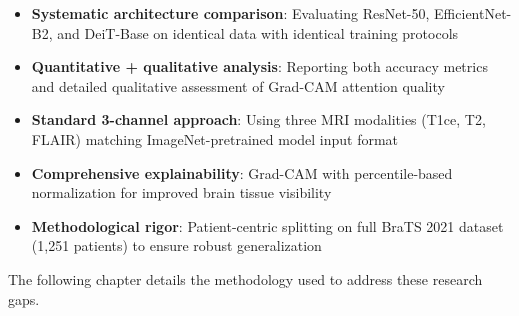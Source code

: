 
\begin{itemize}
    \item \textbf{Systematic architecture comparison}: Evaluating ResNet-50, EfficientNet-B2, and DeiT-Base on identical data with identical training protocols
    
    \item \textbf{Quantitative + qualitative analysis}: Reporting both accuracy metrics and detailed qualitative assessment of Grad-CAM attention quality
    
    \item \textbf{Standard 3-channel approach}: Using three MRI modalities (T1ce, T2, FLAIR) matching ImageNet-pretrained model input format
    
    \item \textbf{Comprehensive explainability}: Grad-CAM with percentile-based normalization for improved brain tissue visibility
    
    \item \textbf{Methodological rigor}: Patient-centric splitting on full BraTS 2021 dataset (1,251 patients) to ensure robust generalization
\end{itemize}

The following chapter details the methodology used to address these research gaps.
